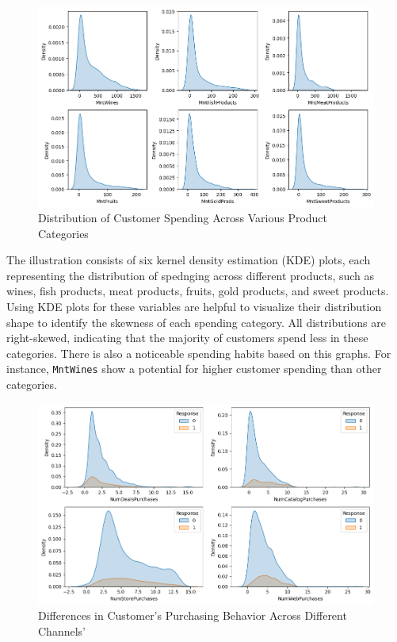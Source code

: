 \begin{figure}[H]
    \centering
    \includegraphics[width=\linewidth]{figures/spending_products.png}
    \caption{Distribution of Customer Spending Across Various Product Categories}
    \label{fig:income hist}
\end{figure}

The illustration consists of six kernel density estimation (KDE) plots, each representing the distribution of spednging across different products, such as wines, fish products, meat products, fruits, gold products, and sweet products. Using KDE plots for these variables are helpful to visualize their distribution shape to identify the skewness of each spending category. All distributions are right-skewed, indicating that the majority of customers spend less in these categories. There is also a noticeable spending habits based on this graphs. For instance, \texttt{MntWines} show a potential for higher customer spending than other categories.

\begin{figure}[H]
    \centering
    \includegraphics[width=\linewidth]{figures/num_purchases.png}
    \caption{Differences in Customer's Purchasing Behavior Across Different Channels'}
    \label{fig:income hist}
\end{figure}

